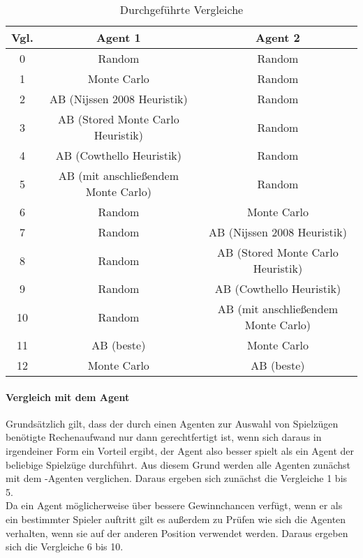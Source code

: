 \begin{table}[ht]
\begin{center}
\begin{tabular}{| c | c | c |} \hline
Vgl. & Agent 1 & Agent 2 \\ \hline
\hline
0  & Random                              & Random                              \\ \hline
\hline
 1 & Monte Carlo                         & Random                              \\ \hline
 2 & AB (Nijssen 2008 Heuristik)         & Random                              \\ \hline
 3 & AB (Stored Monte Carlo Heuristik)   & Random                              \\ \hline
 4 & AB (Cowthello Heuristik)            & Random                              \\ \hline
 5 & AB (mit anschließendem Monte Carlo) & Random                              \\ \hline
\hline
 6 & Random                              & Monte Carlo                         \\ \hline
 7 & Random                              & AB (Nijssen 2008 Heuristik)         \\ \hline
 8 & Random                              & AB (Stored Monte Carlo Heuristik)   \\ \hline
 9 & Random                              & AB (Cowthello Heuristik)            \\ \hline
10 & Random                              & AB (mit anschließendem Monte Carlo) \\ \hline
\hline
11 & AB (beste)                          & Monte Carlo                         \\ \hline
12 & Monte Carlo                         & AB (beste)                          \\ \hline
\end{tabular}
\end{center}
\caption{Durchgeführte Vergleiche}
\label{tbl:cmp-agents}
\end{table}

\paragraph{Vergleich mit dem Agent }
Grundsätzlich gilt, dass der durch einen Agenten zur Auswahl von Spielzügen benötigte Rechenaufwand nur dann gerechtfertigt ist, wenn sich daraus in irgendeiner Form ein Vorteil ergibt, der Agent also besser spielt als ein Agent der beliebige Spielzüge durchführt. Aus diesem Grund werden alle Agenten zunächst mit dem -Agenten verglichen. Daraus ergeben sich zunächst die Vergleiche 1 bis 5.
\\Da ein Agent möglicherweise über bessere Gewinnchancen verfügt, wenn er als ein bestimmter Spieler auftritt gilt es außerdem zu Prüfen wie sich die Agenten verhalten, wenn sie auf der anderen Position verwendet werden. Daraus ergeben sich die Vergleiche 6 bis 10. 

